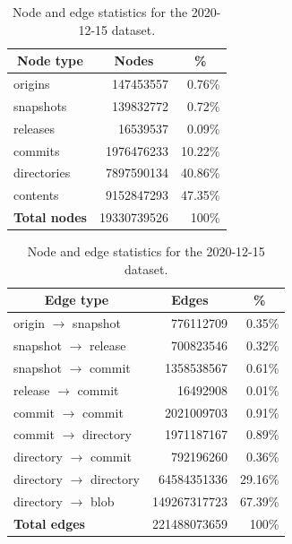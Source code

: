 \begin{table}
  \centering
  \caption{Node and edge statistics for the 2020-12-15 dataset.}%
  \label{tab:corpus-stats}
  \begin{tabular}[t]{l|rr}
     \multicolumn{1}{c|}{\textbf{Node type}}
    & \multicolumn{1}{c}{\textbf{Nodes}}
    & \multicolumn{1}{c}{\textbf{\%}}
    \\\hline\hline
     origins      &  \num{147453557} & 0.76\% \\
     snapshots    &  \num{139832772} & 0.72\% \\
     releases     & \num{16539537} & 0.09\% \\
     commits      & \num{1976476233} & 10.22\% \\
     directories  & \num{7897590134}  & 40.86\% \\
     contents     & \num{9152847293}  & 47.35\% \\
    \hline\hline
    \multicolumn{1}{l|}{\textbf{Total nodes}} & \num{19330739526} & 100\% \\
  \end{tabular}

  \vspace{3ex}

  \begin{tabular}[t]{l|rr}
    \multicolumn{1}{c|}{\textbf{Edge type}}
    & \multicolumn{1}{c}{\textbf{Edges}}
    & \multicolumn{1}{c}{\textbf{\%}}
    \\\hline\hline
     origin     $\to$ snapshot  & \num{776112709} & 0.35\% \\
     snapshot   $\to$ release   & \num{700823546} & 0.32\% \\
     snapshot   $\to$ commit    & \num{1358538567} & 0.61\% \\
     release    $\to$ commit    & \num{16492908} & 0.01\% \\
     commit     $\to$ commit    & \num{2021009703} & 0.91\% \\
     commit     $\to$ directory & \num{1971187167} & 0.89\%\\
     directory  $\to$ commit    & \num{792196260} & 0.36\% \\
     directory  $\to$ directory & \num{64584351336} & 29.16\% \\
     directory  $\to$ blob      & \num{149267317723} & 67.39\% \\
    \hline\hline
    \multicolumn{1}{l|}{\textbf{Total edges}} & \num{221488073659} & 100\% \\
  \end{tabular}
\end{table}

